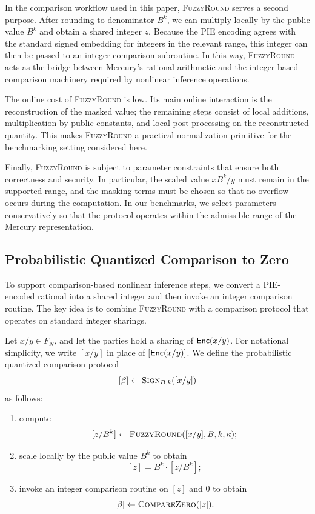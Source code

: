 In the comparison workflow used in this paper, \textsc{FuzzyRound}
serves a second purpose. After rounding to denominator $B^k$, we can
multiply locally by the public value $B^k$ and obtain a shared integer
$z$. Because the PIE encoding agrees with the standard signed embedding
for integers in the relevant range, this integer can then be passed to
an integer comparison subroutine. In this way, \textsc{FuzzyRound}
acts as the bridge between Mercury's rational arithmetic and the
integer-based comparison machinery required by nonlinear inference
operations. %

The online cost of \textsc{FuzzyRound} is low. Its main online
interaction is the reconstruction of the masked value; the remaining
steps consist of local additions, multiplication by public constants,
and local post-processing on the reconstructed quantity. This makes
\textsc{FuzzyRound} a practical normalization primitive for the
benchmarking setting considered here.

Finally, \textsc{FuzzyRound} is subject to parameter constraints that
ensure both correctness and security. In particular, the scaled value
$xB^k/y$ must remain in the supported range, and the masking terms must
be chosen so that no overflow occurs during the computation. In our
benchmarks, we select parameters conservatively so that the protocol
operates within the admissible range of the Mercury representation. %

\subsection{Probabilistic Quantized Comparison to Zero} \label{sec:less than zero}

To support comparison-based nonlinear inference steps, we convert a
PIE-encoded rational into a shared integer and then invoke an integer
comparison routine. The key idea is to combine \textsc{FuzzyRound} with
a comparison protocol that operates on standard integer sharings.

Let $x/y \in F_N$, and let the parties hold a sharing of $\mathsf{Enc}(x/y)$.
For notational simplicity, we write $[x/y]$ in place of
$[\mathsf{Enc}(x/y)]$. We define the probabilistic quantized comparison
protocol
\[
[\beta] \leftarrow \textsc{Sign}_{B,k}([x/y])
\]
as follows:
\begin{enumerate}
    \item compute
    \[
    [z/B^k] \leftarrow \textsc{FuzzyRound}([x/y], B, k, \kappa);
    \]
    \item scale locally by the public value $B^k$ to obtain
    \[
    [z] = B^k \cdot [z/B^k];
    \]
    \item invoke an integer comparison routine on $[z]$ and $0$ to obtain
    \[
    [\beta] \leftarrow \textsc{CompareZero}([z]).
    \]
\end{enumerate}

